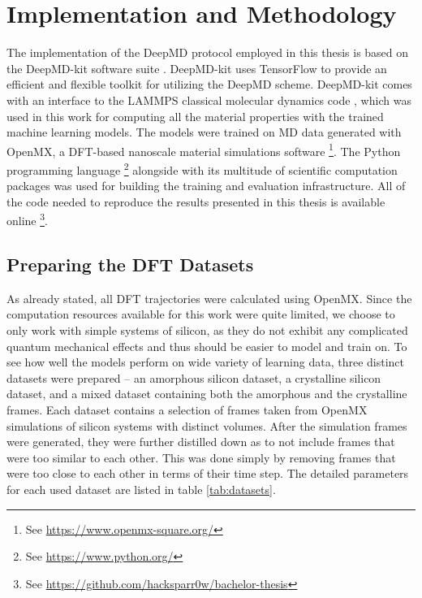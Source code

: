 \chapter{Implementation and Methodology}

The implementation of the DeepMD protocol employed in this thesis is based on
the DeepMD-kit software suite \cite{Wang_DeePMD-kit_A_deep_2018}. DeepMD-kit
uses TensorFlow \cite{tensorflow2015-whitepaper} to provide an efficient and
flexible toolkit for utilizing the DeepMD scheme. DeepMD-kit comes with an
interface to the LAMMPS classical molecular dynamics code \cite{LAMMPS},
which was used in this work for computing all the material properties with the
trained machine learning models. The models were trained on MD data generated
with OpenMX, a DFT-based nanoscale material simulations software
\footnote{
    See \url{https://www.openmx-square.org/}
}. The Python programming language
\footnote{
    See \url{https://www.python.org/}
} alongside with its multitude of scientific computation packages was used for
building the training and evaluation infrastructure. All of the code needed to
reproduce the results presented in this thesis is available online
\footnote{
    See \url{https://github.com/hacksparr0w/bachelor-thesis}
}.

\section{Preparing the DFT Datasets}

As already stated, all DFT trajectories were calculated using OpenMX. Since
the computation resources available for this work were quite limited, we
choose to only work with simple systems of silicon, as they do not exhibit any
complicated quantum mechanical effects and thus should be easier to model and
train on. To see how well the models perform on wide variety of learning data,
three distinct datasets were prepared -- an amorphous silicon dataset, a
crystalline silicon dataset, and a mixed dataset containing both the amorphous
and the crystalline frames. Each dataset contains a selection of frames taken
from OpenMX simulations of silicon systems with distinct volumes. After the
simulation frames were generated, they were further distilled down as to not
include frames that were too similar to each other. This was done simply by
removing frames that were too close to each other in terms of their time step. 
The detailed parameters for each used dataset are listed in table
\ref{tab:datasets}.

